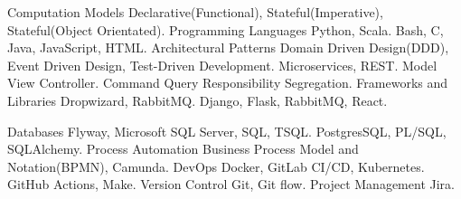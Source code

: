 \begin{cvskills}
  \cvskill
    {Computation Models} %
    { Declarative(Functional), Stateful(Imperative), Stateful(Object Orientated).} 
  \cvskill
    {Programming Languages} %
    {  Python, Scala. } 
  \cvskill
    {} %
    {  Bash, C, Java, JavaScript, HTML.} 
  \cvskill
    {Architectural Patterns} %
    {  Domain Driven Design(DDD), Event Driven Design, Test-Driven Development.}
  \cvskill
    {} %
    {  Microservices, REST.}
  \cvskill
    {} %
    {  Model View Controller.} 
  \cvskill
    {} %
    {  Command Query Responsibility Segregation.} 
  \cvskill
    {Frameworks and Libraries} %
    {  Dropwizard, RabbitMQ.} 
  \cvskill
    {} %
    {  Django, Flask, RabbitMQ, React.} 
  
  \cvskill
  {Databases} %
  {  Flyway, Microsoft SQL Server, SQL, TSQL.} 
  \cvskill
  {} %
  {  PostgresSQL, PL/SQL, SQLAlchemy.} 
  \cvskill
    {Process Automation}
    { Business Process Model and Notation(BPMN), Camunda.}
  \cvskill
    {DevOps} %
    { Docker, GitLab CI/CD, Kubernetes.} %
  \cvskill
    {} %
    {  GitHub Actions, Make.} 
  \cvskill
  {Version Control} %
  { Git, Git flow.} %
  \cvskill
  {Project Management} %
  { Jira.} %
\end{cvskills}